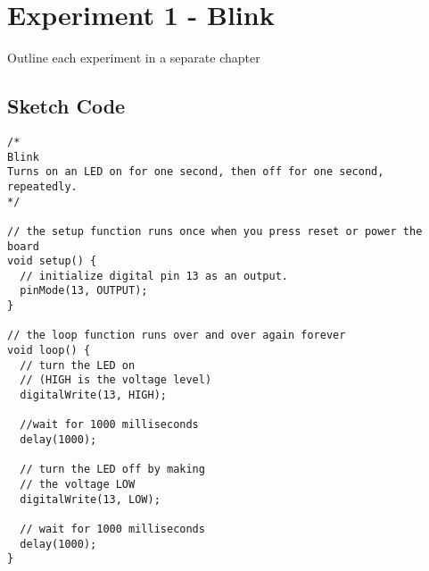 \chapter*{Experiment 1 - Blink}

Outline each experiment in a separate chapter


\section*{Sketch Code}

\begin{lstlisting}
/*
Blink
Turns on an LED on for one second, then off for one second, repeatedly.
*/

// the setup function runs once when you press reset or power the board
void setup() {
  // initialize digital pin 13 as an output.
  pinMode(13, OUTPUT);
}

// the loop function runs over and over again forever
void loop() {
  // turn the LED on 
  // (HIGH is the voltage level)
  digitalWrite(13, HIGH);
	
  //wait for 1000 milliseconds
  delay(1000);
	
  // turn the LED off by making 
  // the voltage LOW
  digitalWrite(13, LOW);    
	            
  // wait for 1000 milliseconds              
  delay(1000);
}
\end{lstlisting}